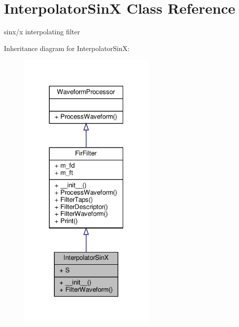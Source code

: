 \hypertarget{classSignalIntegrity_1_1TimeDomain_1_1Filters_1_1InterpolatorSinX_1_1InterpolatorSinX}{}\section{Interpolator\+SinX Class Reference}
\label{classSignalIntegrity_1_1TimeDomain_1_1Filters_1_1InterpolatorSinX_1_1InterpolatorSinX}


sinx/x interpolating filter  




Inheritance diagram for Interpolator\+SinX\+:
\nopagebreak
\begin{figure}[H]
\begin{center}
\leavevmode
\includegraphics[width=193pt]{classSignalIntegrity_1_1TimeDomain_1_1Filters_1_1InterpolatorSinX_1_1InterpolatorSinX__inherit__graph}
\end{center}
\end{figure}



